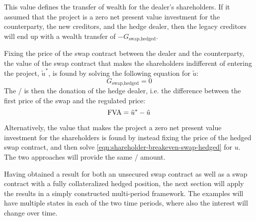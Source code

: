 \documentclass[main.tex]{subfiles}
\begin{document}
        This value defines the transfer of wealth for the dealer's shareholders.
        If it assumed that the project is a zero net present value investment for the counterparty, the new creditors, and the hedge dealer,
        then the legacy creditors will end up with a wealth transfer of $-G_{\text{swap,hedged}}$.

        Fixing the price of the swap contract between the dealer and the counterparty,
        the value of the swap contract that makes the shareholders indifferent of entering the project, $\tilde{u}^{\ast}$,
        is found by solving the following equation for $\tilde{u}$:
        \begin{equation}
            G_{\text{swap,hedged}} = 0
            \label{eqn:shareholder-breakeven-swap-hedged}
        \end{equation}
        The \FVA/ is then the donation of the hedge dealer, i.e. the difference between the first price of the swap and the regulated price:
        \begin{equation}
            \FVA/ = \tilde{u}^{\ast} - \tilde{u}
        \end{equation}

        Alternatively, the value that makes the project a zero net present value investment for the shareholders is found by instead fixing the price of the hedged swap contract,
        and then solve \cref{eqn:shareholder-breakeven-swap-hedged}
        for $u$.
        The two approaches will provide the same \FVA/ amount.

        Having obtained a result for both an unsecured swap contract as well as a swap contract with a fully collateralized hedged position,
        the next section will apply the results in a simply constructed multi-period framework.
        The examples will have multiple states in each of the two time periods, where also the interest will change over time.
\end{document}

